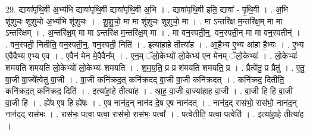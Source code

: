 \documentclass[17pt]{extarticle}
\begin{document}
29. द्यावा॑पृथि॒वी अ॒भ्य॑भि द्यावा॑पृथि॒वी द्यावा॑पृथि॒वी अ॒भि । . द्यावा॑पृथि॒वी इति॒ द्यावा᳚ - पृ॒थि॒वी । . अ॒भि शू॑शुचः शूशुचो अ॒भ्य॑भि शू॑शुचः । . शू॒शु॒चो॒ मा मा शू॑शुचः शूशुचो॒ मा । . मा ऽन्तरि॑क्ष म॒न्तरि॑क्ष॒म् मा मा ऽन्तरि॑क्षम् । . अ॒न्तरि॑क्ष॒म् मा मा ऽन्तरि॑क्ष म॒न्तरि॑क्ष॒म् मा । . मा वन॒स्पती॒न्॒. वन॒स्पती॒न् मा मा वन॒स्पतीन्॑ । . वन॒स्पती॒ नितीति॒ वन॒स्पती॒न्॒. वन॒स्पती॒ निति॑ । . इत्या॑हा॒हे तीत्या॑ह । . आ॒है॒भ्य ए॒भ्य आ॑हा है॒भ्यः । . ए॒भ्य ए॒वैवैभ्य ए॒भ्य ए॒व । . ए॒वैन॑ मेन मे॒वैवैन᳚म् । . ए॒न॒म् ॅलो॒केभ्यो॑ लो॒केभ्य॑ एन मेनम् ॅलो॒केभ्यः॑ । . लो॒केभ्यः॑ शमयति शमयति लो॒केभ्यो॑ लो॒केभ्यः॑ शमयति । . श॒म॒य॒ति॒ प्र प्र श॑मयति शमयति॒ प्र । . प्रैत्वे॑तु॒ प्र प्रैतु॑ । . ए॒तु॒ वा॒जी वा॒ज्ये᳚त्वेतु वा॒जी । . वा॒जी कनि॑क्रद॒त् कनि॑क्रदद् वा॒जी वा॒जी कनि॑क्रदत् । . कनि॑क्रद॒ दितीति॒ कनि॑क्रद॒त् कनि॑क्रद॒ दिति॑ । . इत्या॑हा॒हे तीत्या॑ह । . आ॒ह॒ वा॒जी वा॒ज्या॑हाह वा॒जी । . वा॒जी हि हि वा॒जी वा॒जी हि । . ह्ये॑ष ए॒ष हि ह्ये॑षः । . ए॒ष नान॑द॒न् नान॑द दे॒ष ए॒ष नान॑दत् । . नान॑द॒द् रास॑भो॒ रास॑भो॒ नान॑द॒न् नान॑द॒द् रास॑भः । . रास॑भः॒ पत्वा॒ पत्वा॒ रास॑भो॒ रास॑भः॒ पत्वा᳚ । . पत्वेतीति॒ पत्वा॒ पत्वेति॑ । . इत्या॑हा॒हे तीत्या॑ह । \newline
\end{document}
